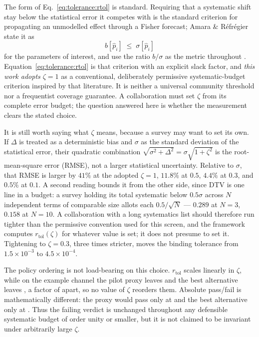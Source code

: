 The form of Eq.~\eqref{eq:tolerance:rtol} is standard. Requiring that a systematic shift stay below the statistical error it competes with is the standard criterion for propagating an unmodelled effect through a Fisher forecast; Amara \& R\'efr\'egier state it as
\begin{equation}
\label{eq:tolerance:arcrit}
b[\hat{p}_i] \;\le\; \sigma[\hat{p}_i]
\end{equation}
for the parameters of interest, and use the ratio $b/\sigma$ as the metric throughout \cite{amara2008}. Equation~\eqref{eq:tolerance:rtol} is that criterion with an explicit slack factor, and \emph{this work adopts $\zeta = 1$} as a conventional, deliberately permissive systematic-budget criterion inspired by that literature.  It is neither a universal community threshold nor a frequentist coverage guarantee.  A collaboration must set $\zeta$ from its complete error budget; the question answered here is whether the measurement clears the stated choice.

It is still worth saying what $\zeta$ means, because a survey may want to set its own. If $\Delta$ is treated as a deterministic bias and $\sigma$ as the standard deviation of the statistical error, their quadratic combination $\sqrt{\sigma^2+\Delta^2}=\sigma\sqrt{1+\zeta^2}$ is the root-mean-square error (RMSE), not a larger statistical uncertainty.  Relative to $\sigma$, that RMSE is larger by $41\%$ at the adopted $\zeta = 1$, $11.8\%$ at $0.5$, $4.4\%$ at $0.3$, and $0.5\%$ at $0.1$. A second reading bounds it from the other side, since DTV is one line in a budget: a survey holding its total systematic below $0.5\sigma$ across $N$ independent terms of comparable size allots each $0.5/\sqrt{N}$ --- $0.289$ at $N = 3$, $0.158$ at $N = 10$. A collaboration with a long systematics list should therefore run tighter than the permissive convention used for this screen, and the framework computes $r_{\text{tol}}(\zeta)$ for whatever value is set; it does not presume to set it. Tightening to $\zeta = 0.3$, three times stricter, moves the binding tolerance from $1.5 \times 10^{-3}$ to $4.5 \times 10^{-4}$.

The policy ordering is not load-bearing on this choice. $r_{\text{tol}}$ scales linearly in $\zeta$, while on the example channel the pilot proxy leaves  and the best alternative leaves , a factor of  apart, so no value of $\zeta$ reorders them.  Absolute pass/fail is mathematically different: the proxy would pass only at  and the best alternative only at .  Thus the failing verdict is unchanged throughout any defensible systematic budget of order unity or smaller, but it is not claimed to be invariant under arbitrarily large $\zeta$.

